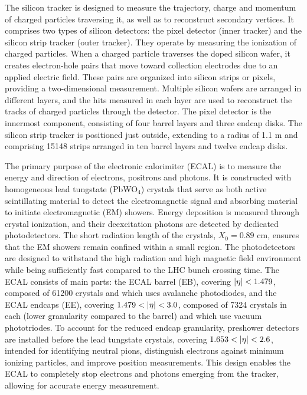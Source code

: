 The silicon tracker is designed to measure the trajectory, charge and momentum of charged particles traversing it, as well as to reconstruct secondary vertices. It comprises two types of silicon detectors: the pixel detector (inner tracker) and the silicon strip tracker (outer tracker). They operate by measuring the ionization of charged particles. When a charged particle traverses the doped silicon wafer, it creates electron-hole pairs that move toward collection electrodes due to an applied electric field. These pairs are organized into silicon strips or pixels, providing a two-dimensional measurement. Multiple silicon wafers are arranged in different layers, and the hits measured in each layer are used to reconstruct the tracks of charged particles through the detector. The pixel detector is the innermost component, consisting of four barrel layers and three endcap disks. The silicon strip tracker is positioned just outside, extending to a radius of 1.1 m and comprising 15148 strips arranged in ten barrel layers and twelve endcap disks.

The primary purpose of the electronic calorimiter (ECAL) is to measure the energy and direction of electrons, positrons and photons. It is constructed with homogeneous lead tungstate (PbWO$_4$) crystals that serve as both active scintillating material to detect the electromagnetic signal and absorbing material to initiate electromagnetic (EM) showers. Energy deposition is measured through crystal ionization, and their deexcitation photons are detected by dedicated photodetectors. The short radiation length of the crystals, $X_0 = 0.89$ cm, ensures that the EM showers remain confined within a small region. The photodetectors are designed to withstand the high radiation and high magnetic field environment while being sufficiently fast compared to the LHC bunch crossing time. The ECAL consists of main parts: the ECAL barrel (EB), covering $\left\lvert\eta\right\rvert < 1.479$, composed of 61200 crystals and which uses avalanche photodiodes, and the ECAL endcaps (EE), covering $1.479 < \left\lvert\eta\right\rvert < 3.0$, composed of 7324 crystals in each (lower granularity compared to the barrel) and which use vacuum phototriodes. To account for the reduced endcap granularity, preshower detectors are installed before the lead tungstate crystals, covering $1.653 < \left\lvert\eta\right\rvert < 2.6$, intended for identifying neutral pions, distinguish electrons against minimum ionizing particles, and improve position measurements. This design enables the ECAL to completely stop electrons and photons emerging from the tracker, allowing for accurate energy measurement.

